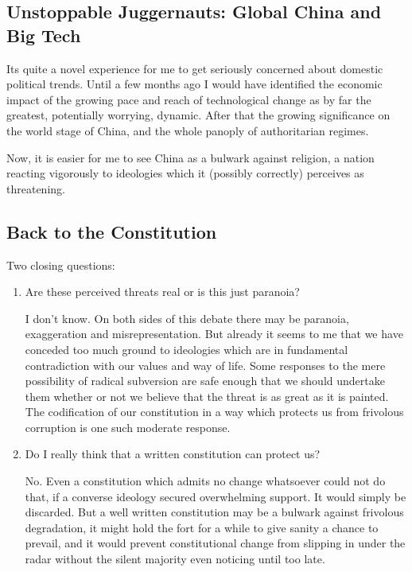 \documentclass[14pt,titlepage]{extarticle}
\begin{document}
\subsection{Unstoppable Juggernauts: Global China and Big Tech}

Its quite a novel experience for me to get seriously concerned about domestic political trends.
Until a few months ago I would have identified the economic impact of the growing pace and reach of technological change as by far the greatest, potentially worrying, dynamic.
After that the growing significance on the world stage of China, and the whole panoply of authoritarian regimes.

Now, it is easier for me to see China as a bulwark against religion, a nation reacting vigorously to ideologies which it (possibly correctly) perceives as threatening.

\subsection{Back to the Constitution}

Two closing questions:

\begin{enumerate}
\item Are these perceived threats real or is this just paranoia?

  I don't know.
  On both sides of this debate there may be paranoia, exaggeration and misrepresentation.
  But already it seems to me that we have conceded too much ground to ideologies which are in fundamental contradiction with our values and way of life.
  Some responses to the mere possibility of radical subversion are safe enough that we should undertake them whether or not we believe that the threat is as great as it is painted.
  The codification of our constitution in a way which protects us from frivolous corruption is one such moderate response.

\item Do I really think that a written constitution can protect us?

  No.
  Even a constitution which admits no change whatsoever could not do that, if a converse ideology secured overwhelming support.
  It would simply be discarded.
  But a well written constitution may be a bulwark against frivolous degradation, it might hold the fort for a while to give sanity a chance to prevail, and it would prevent constitutional change from slipping in under the radar without the silent majority even noticing until too late.
\end{enumerate}
\end{document}
